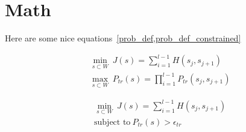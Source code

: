 \section{Math}

Here are some nice equations~\cref{prob_def,prob_def_constrained}

\begin{align}
\label{prob_def}
&\min_{s\subset W}\ J(s) = \sum_{i=1}^{l-1} H(s_j, s_{j+1}) \\
&\max_{s\subset W}\ P_{tr}(s) = \prod_{i=1}^{l-1} P_{tr}(s_j, s_{j+1}) \nonumber
\end{align}

\begin{align}
\label{prob_def_constrained}
&\min_{s\subset W}\ J(s) = \sum_{i=1}^{l-1} H(s_j, s_{j+1}) \\
&\text{subject to} \ P_{tr}(s)>\epsilon_{tr} \nonumber
\end{align}
